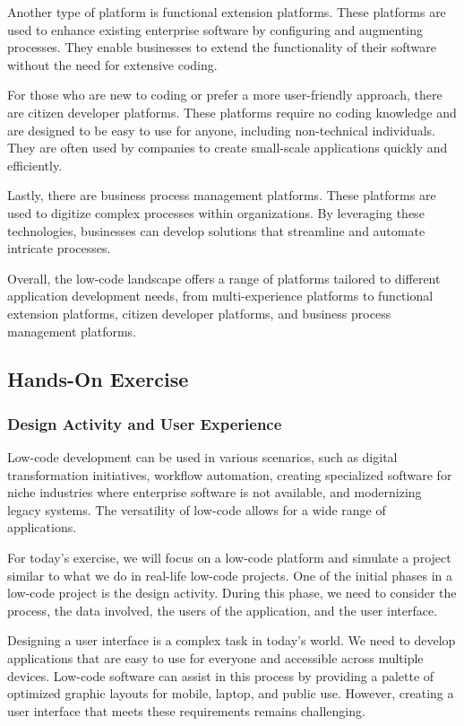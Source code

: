 Another type of platform is functional extension platforms. These
platforms are used to enhance existing enterprise software by
configuring and augmenting processes. They enable businesses to extend
the functionality of their software without the need for extensive
coding.

For those who are new to coding or prefer a more user-friendly approach,
there are citizen developer platforms. These platforms require no coding
knowledge and are designed to be easy to use for anyone, including
non-technical individuals. They are often used by companies to create
small-scale applications quickly and efficiently.

Lastly, there are business process management platforms. These platforms
are used to digitize complex processes within organizations. By
leveraging these technologies, businesses can develop solutions that
streamline and automate intricate processes.

Overall, the low-code landscape offers a range of platforms tailored to
different application development needs, from multi-experience platforms
to functional extension platforms, citizen developer platforms, and
business process management platforms.

\subsection{Hands-On Exercise}\label{hands-on-exercise}

\subsubsection{Design Activity and User
  Experience}\label{design-activity-and-user-experience}

Low-code development can be used in various scenarios, such as digital
transformation initiatives, workflow automation, creating specialized
software for niche industries where enterprise software is not
available, and modernizing legacy systems. The versatility of low-code
allows for a wide range of applications.

For today's exercise, we will focus on a low-code platform and simulate
a project similar to what we do in real-life low-code projects. One of
the initial phases in a low-code project is the design activity. During
this phase, we need to consider the process, the data involved, the
users of the application, and the user interface.

Designing a user interface is a complex task in today's world. We need
to develop applications that are easy to use for everyone and accessible
across multiple devices. Low-code software can assist in this process by
providing a palette of optimized graphic layouts for mobile, laptop, and
public use. However, creating a user interface that meets these
requirements remains challenging.

